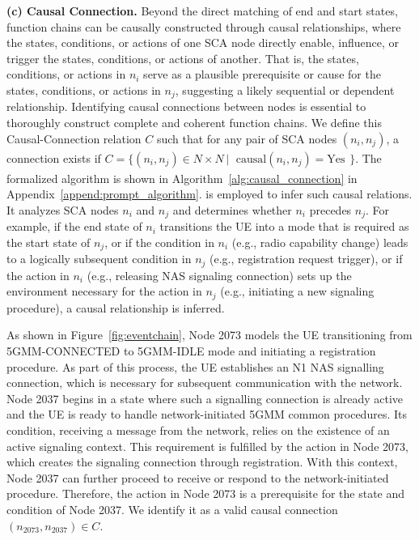 \noindent \textbf{(c) \textbf{Causal Connection.}}
Beyond the direct matching of end and start states, function chains can be causally constructed through causal relationships, where the states, conditions, or actions of one SCA node directly enable, influence, or trigger the states, conditions, or actions of another.  
That is, the states, conditions, or actions in $n_i$ serve as a plausible prerequisite or cause for the states, conditions, or actions in $n_j$, suggesting a likely sequential or dependent relationship. 
Identifying causal connections between nodes is essential to thoroughly construct complete and coherent function chains. 
We define this Causal-Connection relation $C$ such that for any pair of SCA nodes $(n_i, n_j)$, a connection exists if $ C = \{ (n_i, n_j) \in N \times N \, |\ \begin{array}{l}
\text{causal}(n_i, n_j) = \text{Yes}
\end{array}
\}$. 
The formalized algorithm is shown in Algorithm~\ref{alg:causal_connection} in Appendix~\ref{append:prompt_algorithm}.
\core is employed to infer such causal relations. 
It analyzes SCA nodes $n_i$ and $n_j$ and determines whether $n_i$ precedes $n_j$. For example, if the end state of $n_i$ transitions the UE into a mode that is required as the start state of $n_j$, or if the condition in $n_i$ (e.g., radio capability change) leads to a logically subsequent condition in $n_j$ (e.g., registration request trigger), or if the action in $n_i$ (e.g., releasing NAS signaling connection) sets up the environment necessary for the action in $n_j$ (e.g., initiating a new signaling procedure), a causal relationship is inferred.


As shown in Figure~\ref{fig:eventchain}, Node 2073 models the UE transitioning from 5GMM-CONNECTED to 5GMM-IDLE mode and initiating a registration procedure. As part of this process, the UE establishes an N1 NAS signalling connection, which is necessary for subsequent communication with the network. 
Node 2037 begins in a state where such a signalling connection is already active and the UE is ready to handle network-initiated 5GMM common procedures. 
Its condition, receiving a message from the network, relies on the existence of an active signaling context. 
This requirement is fulfilled by the action in Node 2073, which creates the signaling connection through registration. With this context, Node 2037 can further proceed to receive or respond to the network-initiated procedure. 
Therefore, the action in Node 2073 is a prerequisite for the state and condition of Node 2037. We identify it as a valid causal connection $(n_{2073}, n_{2037}) \in C$.  

